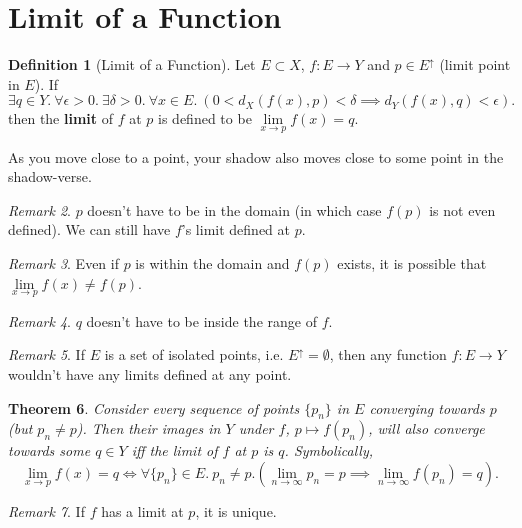 \documentclass[a4paper,12pt]{report}
\newcommand{\tb}{\textbf}
\theoremstyle{plain}
\newtheorem{theorem}{\color{blue}Theorem}[chapter] %
\theoremstyle{definition}
\newtheorem{definition}[theorem]{\color{red}Definition} %
\theoremstyle{remark}
\newtheorem{remark}[theorem]{\color{ForestGreen}Remark} %
\begin{document}
\section{Limit of a Function}
\begin{definition}[Limit of a Function]
Let $E\subset X$, $f:E\to Y$ and $p\in E^{\uparrow}$ (limit point in $E$). If
\[
\exists q\in Y.\:\forall\epsilon>0.\:\exists\delta>0.\:\forall x\in E.\:\left(0<d_X(f(x),p)<\delta\implies d_Y(f(x),q)<\epsilon\right).
\]
then the \tb{limit} of $f$ at $p$ is defined to be $\lim\limits_{x\to p}f(x)=q$.
\end{definition}
\begin{insight}
As you move close to a point, your shadow also moves close to some point in the shadow-verse.
\end{insight}
\begin{remark}
$p$ doesn't have to be in the domain (in which case $f(p)$ is not even defined). We can still have $f$'s limit defined at $p$.
\end{remark}
\begin{remark}
Even if $p$ is within the domain and $f(p)$ exists, it is possible that $\lim\limits_{x\to p}f(x)\neq f(p)$.
\end{remark}
\begin{remark}
$q$ doesn't have to be inside the range of $f$.
\end{remark}
\begin{remark}
If $E$ is a set of isolated points, i.e. $E^{\uparrow}=\emptyset$, then any function $f:E\to Y$ wouldn't have any limits defined at any point.
\end{remark}
\begin{theorem}
Consider every sequence of points $\{p_n\}$ in $E$ converging towards $p$ (but $p_n\neq p$). Then their images in $Y$ under $f$, $p\mapsto f(p_n)$, will also converge towards some $q\in Y$ \emph{iff} the limit of $f$ at $p$ is $q$. Symbolically,
\[\lim\limits_{x\to p} f(x)=q \iff \forall\{p_n\}\in E.\:p_n\neq p.\left(\lim\limits_{n\to\infty} p_n=p\implies \lim\limits_{n\to\infty} f(p_n)=q\right).\]
\end{theorem}
\begin{remark}
If $f$ has a limit at $p$, it is unique.
\end{remark}
\end{document}

